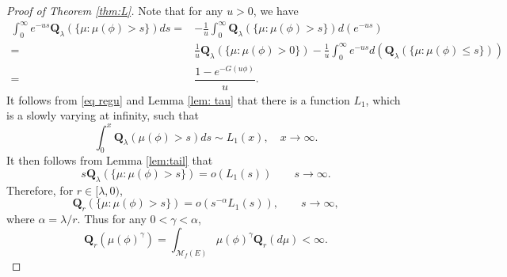 \documentclass[12pt,a4paper]{amsart}
\numberwithin{equation}{section}
\theoremstyle{plain}
\theoremstyle{definition}
\theoremstyle{remark}
\begin{document}
\begin{proof}[Proof of Theorem \ref{thm:L}]
Note that for any $u>0$, we have
\begin{align}
\int_0^\infty e^{-us}{\mathbf Q}_\lambda(\{\mu: \mu(\phi)>s\})ds=&-\frac{1}{u}\int^\infty_0{\mathbf Q}_\lambda(\{\mu: \mu(\phi)>s\})d(e^{-us})\\
=&\frac{1}{u}{\mathbf Q}_\lambda(\{\mu: \mu(\phi)>0\})-\frac{1}{u}\int^\infty_0e^{-us}d({\mathbf Q}_\lambda(\{\mu: \mu(\phi)\le s\}))\\
=&\dfrac{1-e^{-G(u\phi)}}{u}.
\end{align}
It follows from  \eqref{eq regu} and Lemma \ref{lem: tau} that there is a function $L_1$, which is a slowly varying at infinity, such that
$$\int^x_0{\mathbf Q}_\lambda(\mu(\phi)>s)ds\sim L_1(x),\quad x\to\infty.$$
It then follows from Lemma \ref{lem:tail} that
$$s{\mathbf Q}_\lambda(\{\mu: \mu(\phi)>s\})=o(L_1(s))\qquad s\to\infty.$$
Therefore, for $r\in[\lambda, 0)$,
\begin{equation}
{\mathbf Q}_r(\{\mu: \mu(\phi)>s\})=o(s^{-\alpha}L_1(s)),\qquad s\to\infty,
\end{equation}
where $\alpha=\lambda/r.$
Thus for any $0<\gamma<\alpha$,
\[
{\mathbf Q}_r\left(\mu(\phi)^{\gamma}\right)=\int_{{\mathcal M}_f(E)}\mu(\phi)^\gamma\mathbf Q_r(d\mu)<\infty.
\]


\end{proof}
\end{document}
